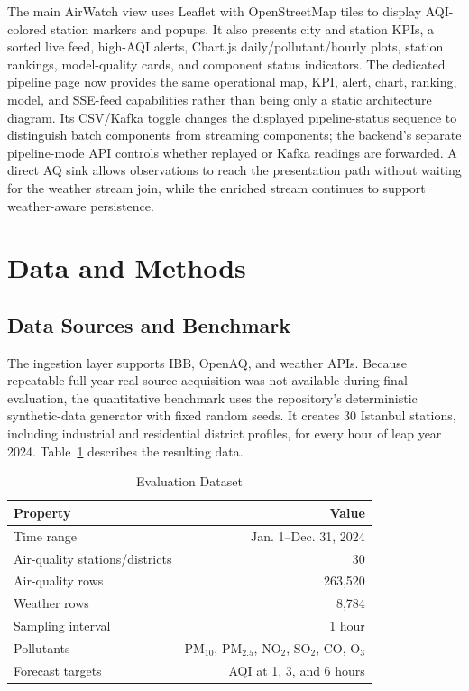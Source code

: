 \documentclass[12pt,a4paper]{article}
\begin{document}
The main AirWatch view uses Leaflet with OpenStreetMap tiles to display
AQI-colored station markers and popups. It also presents city and station
KPIs, a sorted live feed, high-AQI alerts, Chart.js daily/pollutant/hourly
plots, station rankings, model-quality cards, and component status indicators.
The dedicated pipeline page now provides the same operational map, KPI, alert,
chart, ranking, model, and SSE-feed capabilities rather than being only a
static architecture diagram. Its CSV/Kafka toggle changes the displayed
pipeline-status sequence to distinguish batch components from streaming
components; the backend's separate pipeline-mode API controls whether replayed
or Kafka readings are forwarded. A direct AQ sink allows observations to reach
the presentation path without waiting for the weather stream join, while the
enriched stream continues to support weather-aware persistence.

\section{Data and Methods}
\subsection{Data Sources and Benchmark}
The ingestion layer supports IBB, OpenAQ, and weather APIs. Because repeatable
full-year real-source acquisition was not available during final evaluation,
the quantitative benchmark uses the repository's deterministic synthetic-data
generator with fixed random seeds. It creates 30 Istanbul stations, including
industrial and residential district profiles, for every hour of leap year
2024. Table~\ref{tab:data} describes the resulting data.

\begin{table}[H]
\caption{Evaluation Dataset}
\label{tab:data}
\centering
\begin{tabular}{lr}
\toprule
\textbf{Property} & \textbf{Value}\\
\midrule
Time range & Jan. 1--Dec. 31, 2024\\
Air-quality stations/districts & 30\\
Air-quality rows & 263,520\\
Weather rows & 8,784\\
Sampling interval & 1 hour\\
Pollutants & PM$_{10}$, PM$_{2.5}$, NO$_2$, SO$_2$, CO, O$_3$\\
Forecast targets & AQI at 1, 3, and 6 hours\\
\bottomrule
\end{tabular}
\end{table}
\end{document}

